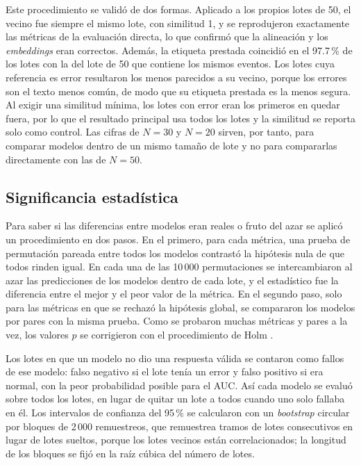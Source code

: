 Este procedimiento se validó de dos formas. Aplicado a los propios lotes de 50, el vecino fue siempre el mismo lote, con similitud 1, y se reprodujeron exactamente las métricas de la evaluación directa, lo que confirmó que la alineación y los \textit{embeddings} eran correctos. Además, la etiqueta prestada coincidió en el 97.7\,\% de los lotes con la del lote de 50 que contiene los mismos eventos. Los lotes cuya referencia es error resultaron los menos parecidos a su vecino, porque los errores son el texto menos común, de modo que su etiqueta prestada es la menos segura. Al exigir una similitud mínima, los lotes con error eran los primeros en quedar fuera, por lo que el resultado principal usa todos los lotes y la similitud se reporta solo como control. Las cifras de $N = 30$ y $N = 20$ sirven, por tanto, para comparar modelos dentro de un mismo tamaño de lote y no para compararlas directamente con las de $N = 50$.

\subsection{Significancia estadística}\label{subsec:met_significancia}

Para saber si las diferencias entre modelos eran reales o fruto del azar se aplicó un procedimiento en dos pasos. En el primero, para cada métrica, una prueba de permutación pareada entre todos los modelos contrastó la hipótesis nula de que todos rinden igual. En cada una de las 10\,000 permutaciones se intercambiaron al azar las predicciones de los modelos dentro de cada lote, y el estadístico fue la diferencia entre el mejor y el peor valor de la métrica. En el segundo paso, solo para las métricas en que se rechazó la hipótesis global, se compararon los modelos por pares con la misma prueba. Como se probaron muchas métricas y pares a la vez, los valores $p$ se corrigieron con el procedimiento de Holm \cite{holm1979_sequential}.

Los lotes en que un modelo no dio una respuesta válida se contaron como fallos de ese modelo: falso negativo si el lote tenía un error y falso positivo si era normal, con la peor probabilidad posible para el AUC. Así cada modelo se evaluó sobre todos los lotes, en lugar de quitar un lote a todos cuando uno solo fallaba en él. Los intervalos de confianza del 95\,\% se calcularon con un \textit{bootstrap} circular por bloques de 2\,000 remuestreos, que remuestrea tramos de lotes consecutivos en lugar de lotes sueltos, porque los lotes vecinos están correlacionados; la longitud de los bloques se fijó en la raíz cúbica del número de lotes.

